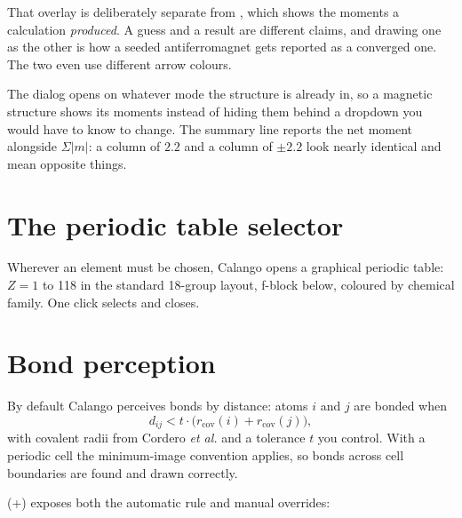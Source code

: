 \begin{calnote}
That overlay is deliberately separate from , which shows
the moments a calculation \emph{produced}. A guess and a result are different
claims, and drawing one as the other is how a seeded antiferromagnet gets
reported as a converged one. The two even use different arrow colours.
\end{calnote}

The dialog opens on whatever mode the structure is already in, so a magnetic
structure shows its moments instead of hiding them behind a dropdown you would
have to know to change. The summary line reports the net moment alongside
$\Sigma|m|$: a column of $2.2$ and a column of $\pm 2.2$ look nearly identical
and mean opposite things.

\section{The periodic table selector}

Wherever an element must be chosen, Calango opens a graphical periodic
table: $Z = 1$ to 118 in the standard 18-group layout, f-block below,
coloured by chemical family. One click selects and closes.

\section{Bond perception}
\label{sec:bonds}

By default Calango perceives bonds by distance: atoms $i$ and $j$ are
bonded when
\[
  d_{ij} < t \cdot \bigl(r_\text{cov}(i) + r_\text{cov}(j)\bigr),
\]
with covalent radii from Cordero \emph{et al.} and a tolerance $t$ you
control. With a periodic cell the minimum-image convention applies, so
bonds across cell boundaries are found and drawn correctly.

\menusep{} (+) exposes both the
automatic rule and manual overrides:

